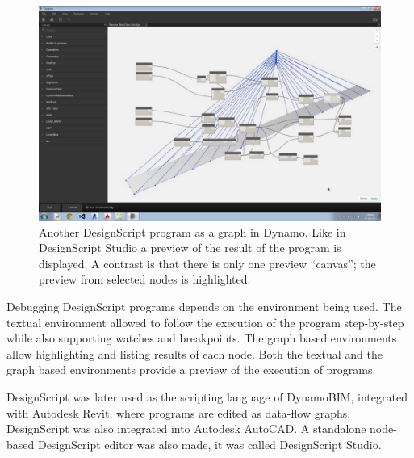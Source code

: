 \documentclass{./llncs2e/llncs}
\begin{document}
	\begin{figure}
		\centering
		\includegraphics[width=1.0\textwidth]{img/ds_dynamo}
		\caption{Another DesignScript program as a graph in Dynamo. Like in DesignScript Studio a preview of the result of the program is displayed. A contrast is that there is only one preview ``canvas''; the preview from selected nodes is highlighted.}
		\label{fig:ds:dynamo}
	\end{figure} 
	
	Debugging DesignScript programs depends on the environment being used. 
	The textual environment allowed to follow the execution of the program step-by-step while also supporting watches and breakpoints. 
	The graph based environments allow highlighting and listing results of each node. 
	Both the textual and the graph based environments provide a preview of the execution of programs.
	
	
	DesignScript was later used as the scripting language of DynamoBIM, integrated with Autodesk Revit, where programs are edited as data-flow graphs. 
	DesignScript was also integrated into Autodesk AutoCAD. 
	A standalone node-based DesignScript editor was also made, it was called DesignScript Studio.
	
\end{document}
